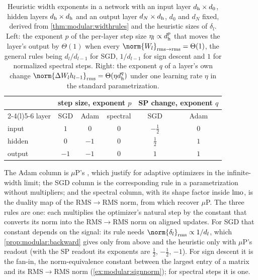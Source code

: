 \begin{refsection}
\begin{table}[t]
\centering\small
\caption{Heuristic width exponents in a network with an input layer $d_{\mathrm h}\times d_0$, hidden layers $d_{\mathrm h}\times d_{\mathrm h}$ and an output layer $d_N\times d_{\mathrm h}$, $d_0$ and $d_N$ fixed, derived from \cref{thm:modular:widthrules} and the heuristic sizes of $\delta_l$. Left: the exponent $p$ of the per-layer step size $\eta_l\propto d_{\mathrm h}^{p}$ that moves the layer's output by $\Theta(1)$ when every $\norm{W_l}_{\rms\to\rms}=\Theta(1)$, the general rules being $d_l/d_{l-1}$ for SGD, $1/d_{l-1}$ for sign descent and $1$ for normalized spectral steps. Right: the exponent $q$ of a layer's own change $\norm{\Delta W_lh_{l-1}}_\rms=\Theta(\eta\modularh^q)$ under one learning rate $\eta$ in the standard parametrization.}\label{tab:modular:rules}
\renewcommand{\arraystretch}{1.05}
\begin{tabular}{@{}lccccc@{}}
\toprule
& \multicolumn{3}{c}{step size, exponent $p$} & \multicolumn{2}{c}{SP change, exponent $q$}\\
\cmidrule(lr){2-4}\cmidrule(l){5-6}
layer & SGD & Adam & spectral & SGD & Adam\\
\midrule
input & $1$ & $0$ & $0$ & $-\frac12$ & $0$\\
hidden & $0$ & $-1$ & $0$ & $\frac12$ & $1$\\
output & $-1$ & $-1$ & $0$ & $1$ & $1$\\
\bottomrule
\end{tabular}
\end{table}

The Adam column is $\mu$P's \parencite{YangHu2021,YangEtAl2021}, which \textcite{YangLittwin2023} justify for adaptive optimizers in the infinite-width limit; the SGD column is the corresponding rule in a parametrization without multipliers; and the spectral column, with its shape factor inside $\operatorname{lmo}$, is the duality map of the RMS$\to$RMS norm, from which \textcite{BernsteinNewhouse2025} recover $\mu$P. The three rules are one: each multiplies the optimizer's natural step by the constant that converts its norm into the RMS$\to$RMS norm on aligned updates. For SGD that constant depends on the signal: its rule needs $\norm{\delta_l}_\rms\propto1/d_l$, which \cref{prop:modular:backward} gives only from above and the heuristic only with $\mu$P's readout (with the SP readout its exponents are $\frac12$, $-\frac12$, $-1$). For sign descent it is the fan-in, the norm-equivalence constant between the largest entry of a matrix and its RMS$\to$RMS norm (\cref{ex:modular:signnorm}); for spectral steps it is one.


\end{refsection}
